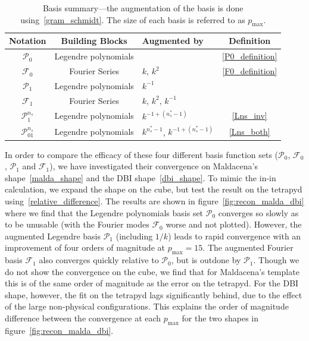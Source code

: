 \documentclass[a4paper,12pt]{extarticle}
\newcommand{\Pmax}{p_\text{max}}
\newcommand{\Lbasic}{\mathcal{P}_0}
\newcommand{\Linvk}{\mathcal{P}_1}
\newcommand{\Lnsinv}{\mathcal{P}^{n_s}_1}
\newcommand{\Lnsboth}{\mathcal{P}^{n_s}_{01}}
\newcommand{\Fbasic}{\mathcal{F}_0}
\newcommand{\Finvk}{\mathcal{F}_1}
\begin{document}
\begin{table}[h!]
  \begin{center}
    \begin{tabular}{c|c|l|c}
      \textbf{Notation} & \textbf{Building Blocks} & \textbf{Augmented by} & \textbf{Definition}\\
      \hline
        $\Lbasic$  & Legendre polynomials &                & \eqref{P0_definition}\\
        $\Fbasic$  & Fourier Series & $k$, $k^2$           & \eqref{F0_definition}\\
        $\Linvk$   & Legendre polynomials & $k^{-1}$       & \\
        $\Finvk$   & Fourier Series & $k$, $k^2$, $k^{-1}$ & \\
        $\Lnsinv$  & Legendre polynomials & $k^{-1+(n_s^{*}-1)}$   & \eqref{Lns_inv}\\
        $\Lnsboth$ & Legendre polynomials& $k^{n_s^{*}-1}$, $k^{-1+(n_s^{*}-1)}$ & \eqref{Lns_both}\\
    \end{tabular}
    \caption{
          Basis summary---the augmentation of the basis is done
          using~\eqref{gram_schmidt}. The size of each basis is
          referred to as $\Pmax$.
      }\label{tab:basis_summary}
  \end{center}
\end{table}

In order to compare the efficacy of these four different basis function sets ($\Lbasic$, $\Fbasic$, $\Linvk$ and $\Finvk$), we have investigated their convergence on Maldacena's shape~\eqref{malda_shape} and the DBI shape~\eqref{dbi_shape}.  To mimic the in-in calculation, we expand the shape on the cube, but test the result on the tetrapyd
using~\eqref{relative_difference}.
The results are shown in figure~\ref{fig:recon_malda_dbi} where we find that the Legendre polynomials basis set $\Lbasic$ converges so slowly as to be unusable (with the Fourier modes $\Fbasic$ worse and not plotted).
However, the augmented Legendre basis $\Linvk$ (including $1/k$) leads to rapid convergence with an improvement of four orders
of magnitude at $\Pmax=15$. The augmented Fourier basis $\Finvk$ also converges
quickly relative to $\Lbasic$, but is outdone by $\Linvk$.
Though we do not show the convergence on the cube, we find that for Maldacena's
template this is of the same order of magnitude as
the error on the tetrapyd.  For the DBI shape, however, the
fit on the tetrapyd lags significantly behind, due to the effect
of the large non-physical configurations. This explains the order of
magnitude difference between the convergence at
each $\Pmax$ for the two shapes in figure~\ref{fig:recon_malda_dbi}.
\end{document}
